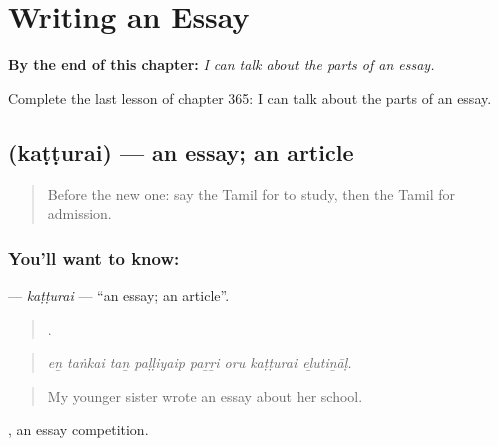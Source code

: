 
\chapter{Writing an Essay}
\label{ch:ta-writing-an-essay}

\begin{chapteropening}
\textbf{By the end of this chapter:} \emph{I can talk about the parts of an essay.}

Complete the last lesson of chapter 365: I can talk about the parts of an essay.
\end{chapteropening}

\section[\texorpdfstring{\ta{கட்டுரை} (kaṭṭurai)}{கட்டுரை (kaṭṭurai)}]{ (kaṭṭurai) — an essay; an article}

\label{lesson:TA-C365-katturai}



\begin{quote}
Before the new one: say the Tamil for to study, then the Tamil for admission.
\end{quote}

\subsection*{You'll want to know: }
\textbf{} — \emph{kaṭṭurai} — \textquotedblleft{}an essay; an article\textquotedblright{}.

\begin{quote}
       .
\end{quote}

\begin{quote}
\emph{eṉ taṅkai taṉ paḷḷiyaip paṟṟi oru kaṭṭurai eḻutiṉāḷ.}
\end{quote}

\begin{quote}
My younger sister wrote an essay about her school.
\end{quote}

 , an essay competition.

